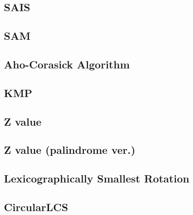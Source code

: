 \documentclass[a4paper,10pt,twocolumn,oneside]{article}
\begin{document}
\subsection{SAIS}


\subsection{SAM}


\subsection{Aho-Corasick Algorithm}


\subsection{KMP}


\subsection{Z value}


\subsection{Z value (palindrome ver.)}


\subsection{Lexicographically Smallest Rotation}


\subsection{CircularLCS}

\end{document}
